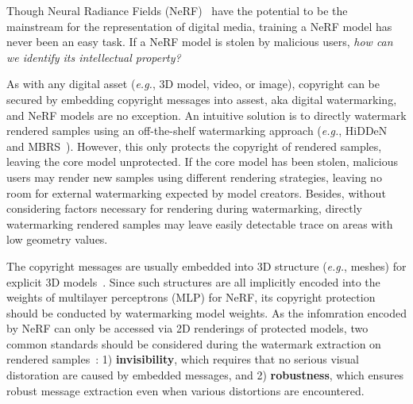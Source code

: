 \documentclass[10pt,twocolumn,letterpaper]{article}
\def\eg{{\emph{e.g.}}}
\def\eg{\emph{e.g.}}
\def\eg{{\emph{e.g.}}}
\begin{document}

Though Neural Radiance Fields (NeRF)~\cite{nerf2020} have the potential to be the mainstream for the representation of digital media, training a NeRF model has never been an easy task. If a NeRF model is stolen by malicious users, \textit{how can we identify its intellectual property?}

As with any digital asset (\eg, 3D model, video, or image), copyright can be secured by embedding copyright messages into assest, aka digital watermarking, and NeRF models are no exception. 
An intuitive solution is to directly watermark rendered samples using an off-the-shelf watermarking approach (\eg, HiDDeN~\cite{zhu2018hidden} and MBRS~\cite{jia2021mbrs}). However, this only protects the copyright of rendered samples, leaving the core model unprotected. If the core model has been stolen, malicious users may render new samples using different rendering strategies, leaving no room for external watermarking expected by model creators. Besides, without considering factors necessary for rendering during watermarking, directly watermarking rendered samples may leave easily detectable trace on areas with low geometry values.

The copyright messages are usually embedded into 3D structure (\eg, meshes) for explicit 3D models~\cite{Yoo_2022_CVPR}. Since such structures are all implicitly encoded into the weights of multilayer perceptrons (MLP) for NeRF, its copyright protection should be conducted by watermarking model weights. As the infomration encoded by NeRF can only be accessed via 2D renderings of protected models, two common standards should be considered during the watermark extraction on rendered samples~\cite{ahmadi2020redmark, jing2021hinet, Yang_2021_ICCV, zhang2020udh}: 1) \textbf{invisibility}, which requires that no serious visual distoration are caused by embedded messages, and 2) \textbf{robustness}, which ensures robust message extraction even when various distortions are encountered. 


\end{document}
